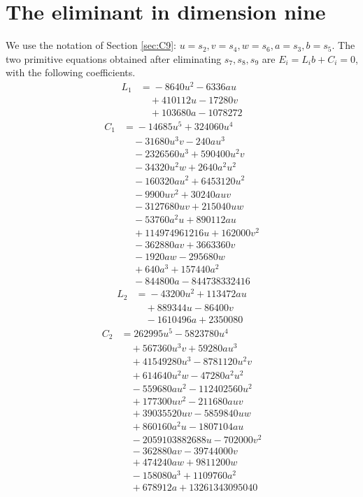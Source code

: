 \documentclass[11pt,reqno,letterpaper]{amsart}
\theoremstyle{definition}
\numberwithin{equation}{section}
\begin{document}
\section{The eliminant in dimension nine}\label{app:c9poly}
We use the notation of Section \ref{sec:C9}:
$u=s_2,v=s_4,w=s_6,a=s_3,b=s_5$.
The two primitive equations obtained after eliminating $s_7,s_8,s_9$
are $E_i=L_i b+C_i=0$, with the following coefficients.
\begin{align*}
L_1&={}-8640 u^{2} - 6336 a u\\
&\quad{} + 410112 u - 17280 v\\
&\quad{} + 103680 a - 1078272
\end{align*}
\begin{align*}
C_1&={}-14685 u^{5} + 324060 u^{4}\\
&\quad{} - 31680 u^{3} v - 240 a u^{3}\\
&\quad{} - 2326560 u^{3} + 590400 u^{2} v\\
&\quad{} - 34320 u^{2} w + 2640 a^{2} u^{2}\\
&\quad{} - 160320 a u^{2} + 6453120 u^{2}\\
&\quad{} - 9900 u v^{2} + 30240 a u v\\
&\quad{} - 3127680 u v + 215040 u w\\
&\quad{} - 53760 a^{2} u + 890112 a u\\
&\quad{} + 114974961216 u + 162000 v^{2}\\
&\quad{} - 362880 a v + 3663360 v\\
&\quad{} - 1920 a w - 295680 w\\
&\quad{} + 640 a^{3} + 157440 a^{2}\\
&\quad{} - 844800 a - 844738332416
\end{align*}
\begin{align*}
L_2&={}-43200 u^{2} + 113472 a u\\
&\quad{} + 889344 u - 86400 v\\
&\quad{} - 1610496 a + 2350080
\end{align*}
\begin{align*}
C_2&={}262995 u^{5} - 5823780 u^{4}\\
&\quad{} + 567360 u^{3} v + 59280 a u^{3}\\
&\quad{} + 41549280 u^{3} - 8781120 u^{2} v\\
&\quad{} + 614640 u^{2} w - 47280 a^{2} u^{2}\\
&\quad{} - 559680 a u^{2} - 112402560 u^{2}\\
&\quad{} + 177300 u v^{2} - 211680 a u v\\
&\quad{} + 39035520 u v - 5859840 u w\\
&\quad{} + 860160 a^{2} u - 1807104 a u\\
&\quad{} - 2059103882688 u - 702000 v^{2}\\
&\quad{} - 362880 a v - 39744000 v\\
&\quad{} + 474240 a w + 9811200 w\\
&\quad{} - 158080 a^{3} + 1109760 a^{2}\\
&\quad{} + 678912 a + 13261343095040
\end{align*}
\end{document}

